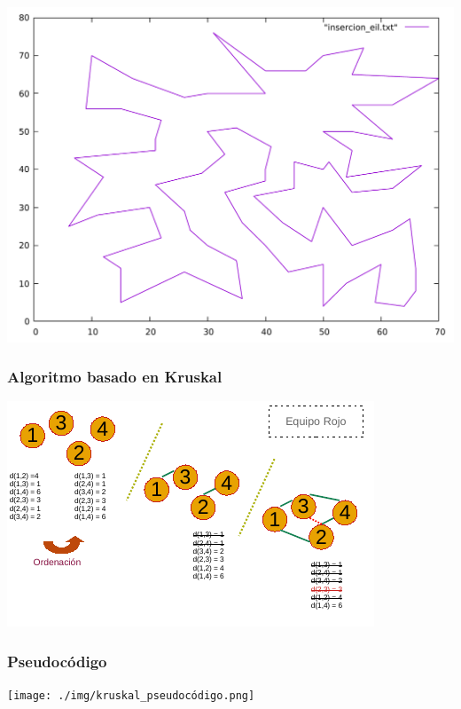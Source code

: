 \documentclass[13pt]{beamer}
\begin{document}
\begin{frame}
			\begin{center}
				\includegraphics[scale=0.2]{../src/insercion_eil.pdf}
			\end{center}
	\end{frame}

    \begin{frame}
		\frametitle{Algoritmo basado en Kruskal}
		\begin{center}
			\includegraphics[scale=1.5]{./img/DibPropio.pdf}
		\end{center}
	\end{frame}

	\begin{frame}
		\frametitle{Pseudocódigo}
		\begin{center}
			\texttt{[image: ./img/kruskal\_pseudocódigo.png]}
		\end{center}
	\end{frame}
\end{document}
